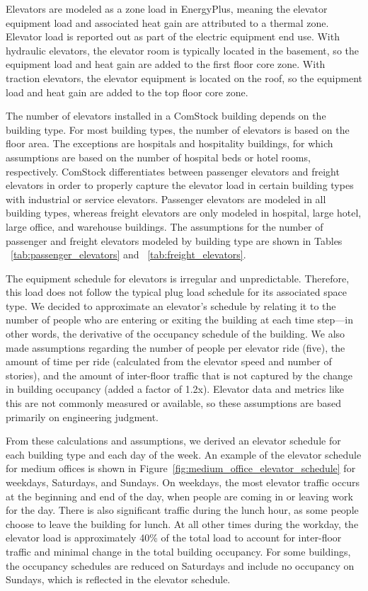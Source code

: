 Elevators are modeled as a zone load in EnergyPlus, meaning the elevator equipment load and associated heat gain are attributed to a thermal zone. Elevator load is reported out as part of the electric equipment end use. With hydraulic elevators, the elevator room is typically located in the basement, so the equipment load and heat gain are added to the first floor core zone. With traction elevators, the elevator equipment is located on the roof, so the equipment load and heat gain are added to the top floor core zone.

The number of elevators installed in a ComStock building depends on the building type. For most building types, the number of elevators is based on the floor area. The exceptions are hospitals and hospitality buildings, for which assumptions are based on the number of hospital beds or hotel rooms, respectively. ComStock differentiates between passenger elevators and freight elevators in order to properly capture the elevator load in certain building types with industrial or service elevators. Passenger elevators are modeled in all building types, whereas freight elevators are only modeled in hospital, large hotel, large office, and warehouse buildings. The assumptions for the number of passenger and freight elevators modeled by building type are shown in Tables ~\ref{tab:passenger_elevators} and ~\ref{tab:freight_elevators}.

%

%

The equipment schedule for elevators is irregular and unpredictable. Therefore, this load does not follow the typical plug load schedule for its associated space type. We decided to approximate an elevator's schedule by relating it to the number of people who are entering or exiting the building at each time step---in other words, the derivative of the occupancy schedule of the building. We also made assumptions regarding the number of people per elevator ride (five), the amount of time per ride (calculated from the elevator speed and number of stories), and the amount of inter-floor traffic that is not captured by the change in building occupancy (added a factor of 1.2x). Elevator data and metrics like this are not commonly measured or available, so these assumptions are based primarily on engineering judgment. 

From these calculations and assumptions, we derived an elevator schedule for each building type and each day of the week. An example of the elevator schedule for medium offices is shown in Figure~\ref{fig:medium_office_elevator_schedule} for weekdays, Saturdays, and Sundays. On weekdays, the most elevator traffic occurs at the beginning and end of the day, when people are coming in or leaving work for the day. There is also significant traffic during the lunch hour, as some people choose to leave the building for lunch. At all other times during the workday, the elevator load is approximately 40\% of the total load to account for inter-floor traffic and minimal change in the total building occupancy. For some buildings, the occupancy schedules are reduced on Saturdays and include no occupancy on Sundays, which is reflected in the elevator schedule. 

